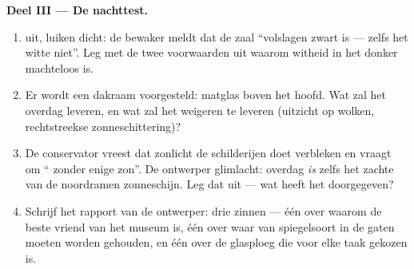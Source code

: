 \begin{problem}
\medskip\noindent\textbf{Deel III --- De nachttest.}
\begin{enumerate}[resume]
  \item {} uit, luiken dicht: de bewaker meldt dat de zaal
        ``volslagen zwart is --- zelfs het witte  niet''. Leg met
        de twee voorwaarden uit waarom witheid in het donker
        machteloos is.
  \item Er wordt een dakraam voorgesteld: matglas boven het hoofd.
        Wat zal het overdag leveren, en wat zal het weigeren te
        leveren (uitzicht op wolken, rechtstreekse zonneschittering)?
  \item De conservator vreest dat zonlicht de schilderijen doet
        verbleken en vraagt om `` zonder enige zon''. De
        ontwerper glimlacht: overdag \emph{is} zelfs het zachte
         van de noordramen zonneschijn. Leg dat uit --- wat
        heeft het doorgegeven?
  \item Schrijf het rapport van de ontwerper: drie zinnen --- één
        over waarom  de beste vriend van het museum is, één
        over waar  van spiegelsoort in de gaten moeten
        worden gehouden, en één over de glasploeg die voor elke taak
        gekozen is.
\end{enumerate}
\end{problem}
